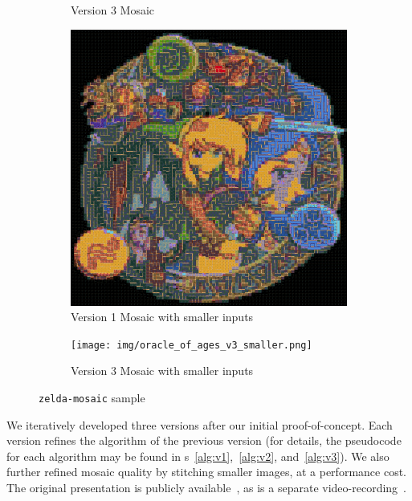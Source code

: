 \documentclass[11pt,conference]{IEEEtran}
\theoremstyle{plain} %
\theoremstyle{definition}
\theoremstyle{remark}
\begin{document}
\begin{figure}[pht]
\begin{subfigure}{0.35\textwidth}
        \caption{Version 3 Mosaic}
    \end{subfigure}
    \begin{subfigure}{0.35\textwidth}
        \includegraphics[width=\linewidth]{img/oracle_of_ages_v1_smaller.png}
        \caption{Version 1 Mosaic with smaller inputs}
    \end{subfigure}
    \begin{subfigure}{0.35\textwidth}
        \texttt{[image: img/oracle\_of\_ages\_v3\_smaller.png]}
        \caption{Version 3 Mosaic with smaller inputs}
    \end{subfigure}
    \caption{\texttt{zelda-mosaic} sample}\label{F:zelda-mosaic-sample}
\end{figure}

We iteratively developed three versions after our initial proof-of-concept. Each
version refines the algorithm of the previous version (for details, the
pseudocode for each algorithm may be found in
\figurename{s}~\ref{alg:v1},~\ref{alg:v2}, and~\ref{alg:v3}). We also further
refined mosaic quality by stitching smaller images, at a performance cost. The
original presentation is publicly available~\cite{zelda_mosaic_pres}, as is a
separate video-recording~\cite{zelda_mosaic_vid}.
\end{document}
